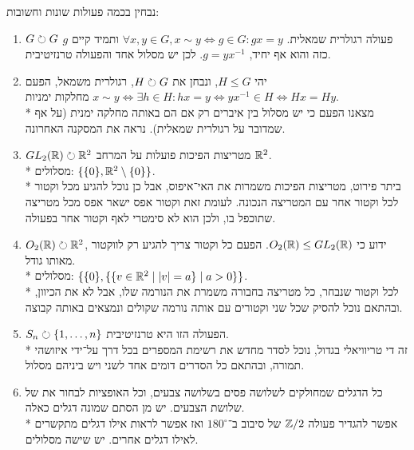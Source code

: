 \begin{example}
	נבחין בכמה פעולות שונות וחשובות:
	\begin{enumerate}
		\item $G \circlearrowright G$ פעולה רגולרית שמאלית. $\forall x, y \in G, x \sim y \iff g \in G : gx = y$ ותמיד קיים $g$ כזה והוא אף יחיד, $g = yx^{-1}$. לכן יש מסלול אחד והפעולה טרנזיטיבית.
		\item יהי $H \le G$, ונבחן את $H \circlearrowright G$, רגולרית משמאל, הפעם $x \sim y \iff \exists h \in H : hx = y \iff yx^{-1} \in H \iff Hx = Hy$ מחלקות ימניות. \\*
			מצאנו הפעם כי יש מסלול בין איברים רק אם הם באותה מחלקה ימנית (על אף שמדובר על רגולרית שמאלית). נראה את המסקנה האחרונה.
		\item $GL_2(\mathbb{R}) \circlearrowright \mathbb{R}^2$ מטריצות הפיכות פועלות על המרחב $\mathbb{R}^2$. \\*
			מסלולים: $\{ \{ 0 \}, \mathbb{R}^2 \setminus \{ 0 \} \}$.\\*
			ביתר פירוט, מטריצות הפיכות משמרות את האי־איפוס, אבל כן נוכל להגיע מכל וקטור לכל וקטור אחר עם המטריצה הנכונה.
			לעומת זאת וקטור אפס ישאר אפס מכל מטריצה שתוכפל בו, ולכן הוא לא סימטרי לאף וקטור אחר בפעולה.
		\item $O_2(\mathbb{R}) \circlearrowright \mathbb{R}^2$, ידוע כי $O_2(\mathbb{R}) \le GL_2(\mathbb{R})$. הפעם כל וקטור צריך להגיע רק לווקטור מאותו גודל.\\*
			מסלולים: $\{ \{0\}, \{ \{ v \in \mathbb{R}^2 \mid |v| = a\} \mid a > 0 \} \}$. \\*
			לכל וקטור שנבחר, כל מטריצה בחבורה משמרת את הנורמה שלו, אבל לא את הכיוון, ובהתאם נוכל להסיק שכל שני וקטורים עם אותה נורמה שקולים ונמצאים באותה קבוצה.
		\item $S_n \circlearrowright \{1, \dots, n\}$ הפעולה הזו היא טרנזיטיבית. \\*
			זה די טריוויאלי בגדול, נוכל לסדר מחדש את רשימת המספרים בכל דרך על־ידי איזושהי תמורה, ובהתאם כל הסדרים דומים אחד לשני ויש ביניהם מסלול.
		\item כל הדגלים שמחולקים לשלושה פסים בשלושה צבעים, וכל האופציות לבחור את של שלושת הצבעים. יש מן הסתם שמונה דגלים כאלה.\\*
			אפשר להגדיר פעולה $\mathbb{Z}/2$ של סיבוב ב־$180^\circ$ ואז אפשר לראות אילו דגלים מתקשרים לאילו דגלים אחרים. יש שישה מסלולים.
	\end{enumerate}
\end{example}

